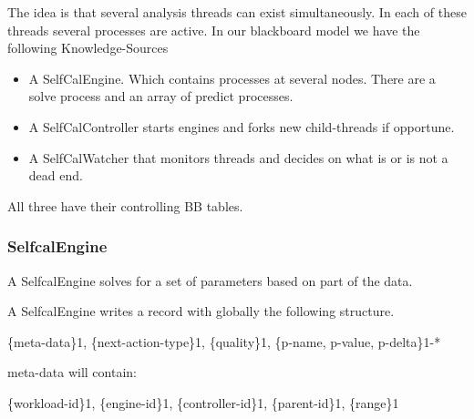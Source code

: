 \documentclass[]{lofar}
\begin{document}
      The idea is that several analysis threads can exist
      simultaneously. In each of these threads several processes are
      active. In our blackboard model we have the following
      Knowledge-Sources

      \begin{itemize}

	\item 

          A SelfCalEngine. Which contains processes at several
          nodes. There are a solve process and an array of predict
          processes.

	\item 

          A SelfCalController starts engines and forks new
          child-threads if opportune.

	\item 

          A SelfCalWatcher that monitors threads and decides on what
          is or is not a dead end.

      \end{itemize}

      All three have their controlling BB tables.

      \subsubsection{SelfcalEngine}
      \label{subsubsec:SelfcalEngine}\hypertarget{subsubsec:SelfcalEngine}{}

        A SelfcalEngine solves for a set of parameters based on part
        of the data.

        A SelfcalEngine writes a record with globally the following
        structure.

        \{meta-data\}1, \{next-action-type\}1, \{quality\}1, \{p-name, p-value, p-delta\}1-*

        meta-data will contain:

        \{workload-id\}1, \{engine-id\}1, \{controller-id\}1, \{parent-id\}1, \{range\}1
\end{document}
